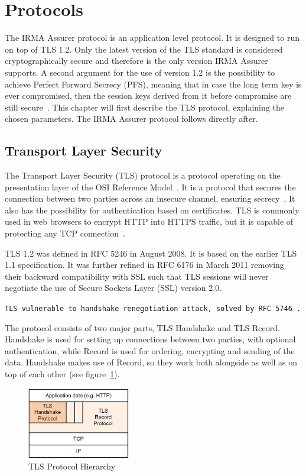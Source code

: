 \section{Protocols}
The IRMA Assurer protocol is an application level protocol. It is designed to run on top of TLS 1.2. Only the latest version of the TLS standard is considered cryptographically secure and therefore is the only version IRMA Assurer supports. A second argument for the use of version 1.2 is the possibility to achieve Perfect Forward Secrecy (PFS), meaning that in case the long term key is ever compromised, then the session keys derived from it before compromise are still secure~\cite{PFS}. This chapter will first describe the TLS protocol, explaining the chosen parameters. The IRMA Assurer protocol follows directly after.

\subsection{Transport Layer Security}
The Transport Layer Security (TLS) protocol is a protocol operating on the presentation layer of the OSI Reference Model~\cite{osi}. It is a protocol that secures the connection between two parties across an insecure channel, ensuring secrecy~\cite{tls1.2}. It also has the possibility for authentication based on certificates. TLS is commonly used in web browsers to encrypt HTTP into HTTPS traffic, but it is capable of protecting any TCP connection~\cite{lecture}.

TLS 1.2 was defined in RFC 5246 in August 2008. It is based on the earlier TLS 1.1 specification. It was further refined in RFC 6176 in March 2011 removing their backward compatibility with SSL such that TLS sessions will never negotiate the use of Secure Sockets Layer (SSL) version 2.0.

\texttt{TLS vulnerable to handshake renegotiation attack, solved by RFC 5746~\cite{lecture}.}

The protocol consists of two major parts, TLS Handshake and TLS Record. Handshake is used for setting up connections between two parties, with optional authentication, while Record is used for ordering, encrypting and sending of the data. Handshake makes use of Record, so they work both alongside as well as on top of each other (see figure~\ref{fig:tlsstack}).

\begin{figure}[htb]
	\centering
		\includegraphics[width=0.40\textwidth]{images/tlsstack.png}
	\caption{TLS Protocol Hierarchy}
	\label{fig:tlsstack}
\end{figure}

